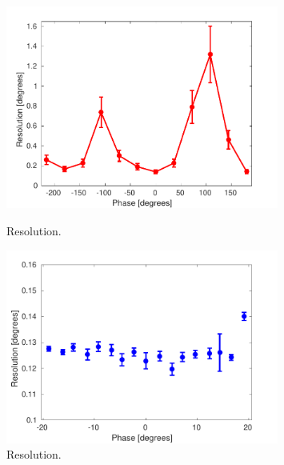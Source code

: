 \begin{figure}
  \centering
  \includegraphics[width=0.8\textwidth]{Figures/phaseMons/resolutionVsShifter}
  \caption{Resolution.}
  \label{f:resolutionVsShifter}
  \includegraphics[width=0.8\textwidth]{Figures/phaseMons/resVsSmallPhasOff}
  \caption{Resolution.}
  \label{f:resVsSmallPhasOff}
\end{figure}




